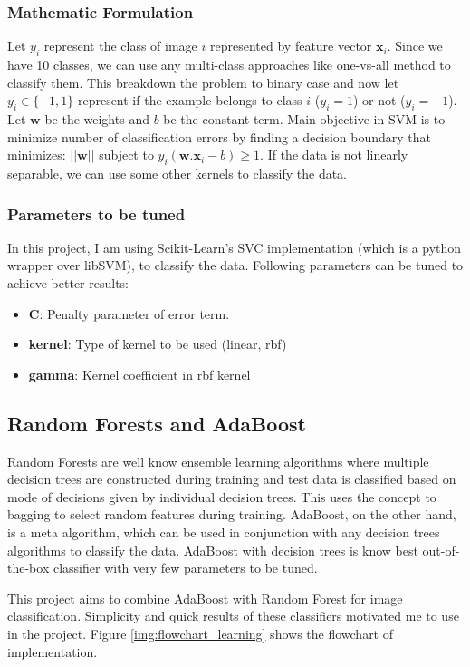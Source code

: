 \documentclass[12pt]{article}
\begin{document}
\subsubsection*{Mathematic Formulation}
Let $y_i$ represent the class of image $i$ represented by feature vector $\textbf{x}_i$. Since we have 10 classes, we can use any multi-class approaches like one-vs-all method to classify them. This breakdown the problem to binary case and now let $y_i \in \{-1,1\}$ represent if the example belongs to class $i$ ($y_i = 1$) or not ($y_i=-1$). Let $\textbf{w}$ be the weights and $b$ be the constant term. Main objective in SVM is to minimize number of classification errors by finding a decision boundary that minimizes:  $ ||\textbf{w}|| $ subject to  $y_i (\textbf{w}.\textbf{x}_i - b) \geq 1 $. If the data is not linearly separable, we can use some other kernels to classify the data.
\subsubsection*{Parameters to be tuned}
In this project, I am using Scikit-Learn's \cite{ref:scikit} SVC implementation (which is a python wrapper over libSVM), to classify the data. Following parameters can be tuned to achieve better results:
\begin{itemize}
\item \textbf{C}: Penalty parameter of error term.
\item \textbf{kernel}: Type of kernel to be used (linear, rbf)
\item \textbf{gamma}: Kernel coefficient in rbf kernel
\end{itemize}

\subsection{Random Forests and AdaBoost}
Random Forests are well know ensemble learning algorithms where multiple decision trees are constructed during training and test data is classified based on mode of decisions given by individual decision trees. This uses the concept to bagging to select random features during training. AdaBoost, on the other hand, is a meta algorithm, which can be used in conjunction with any decision trees algorithms to classify the data. AdaBoost with decision trees is know best out-of-the-box classifier with very few parameters to be tuned.

This project aims to combine AdaBoost with Random Forest for image classification. Simplicity and quick results of these classifiers motivated me to use in the project. Figure \ref{img:flowchart_learning} shows the flowchart of implementation.
\end{document}
